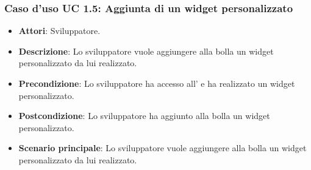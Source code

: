 \subsubsection{Caso d'uso UC 1.5: Aggiunta di un widget personalizzato}
\FloatBarrier
\begin{itemize}
\item\textbf{Attori}: Sviluppatore.
\item\textbf{Descrizione}: Lo sviluppatore vuole aggiungere alla bolla un widget personalizzato da lui realizzato.
\item\textbf{Precondizione}: Lo sviluppatore ha accesso all' e ha realizzato un widget personalizzato.
\item\textbf{Postcondizione}: Lo sviluppatore ha aggiunto alla bolla un widget personalizzato.
\item\textbf{Scenario principale}: Lo sviluppatore vuole aggiungere alla bolla un widget personalizzato da lui realizzato.
\end{itemize}
